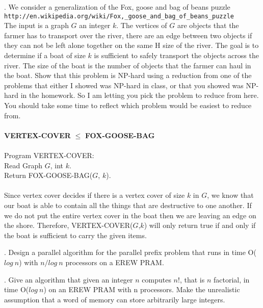 \documentclass[10pt]{article}
\newcommand{\tab}{\hspace*{2em}}
\begin{document}
. We consider a generalization of the Fox, goose and bag of beans puzzle\\
\verb=http://en.wikipedia.org/wiki/Fox,_goose_and_bag_of_beans_puzzle= \\
The input is a graph $G$ an integer $k$. The vertices of $G$ are objects that the farmer has to transport
over the river, there are an edge between two objects if they can not be left alone together on the same
H
size of the river. The goal is to determine if a boat of size $k$ is sufficient to safely transport the objects
across the river. The size of the boat is the number of objects that the farmer can haul in the boat.
Show that this problem is NP-hard using a reduction from one of the problems that either I showed
was NP-hard in class, or that you showed was NP-hard in the homework. So I am letting you pick the
problem to reduce from here. You should take some time to reflect which problem would be easiest to
reduce from.\\
\\
\textbf{VERTEX-COVER} $\leq$ \textbf{FOX-GOOSE-BAG}\\
\\
Program VERTEX-COVER:\\
\tab Read Graph $G$, int $k$.\\
\tab Return FOX-GOOSE-BAG($G$, $k$).\\
\\
Since vertex cover decides if there is a vertex cover of size $k$ in $G$, we know that 
our boat is able to contain all the things that are destructive to one another. If we do
not put the entire vertex cover in the boat then we are leaving an edge on the shore. Therefore,
VERTEX-COVER($G$,$k$) will only return true if and only if the boat is sufficient to carry the given
items. 

. Design a parallel algorithm for the parallel prefix problem that runs in time O($log~n$) with $n/log~n$
processors on a EREW PRAM.

. Give an algorithm that given an integer $n$ computes $n!$, that is $n$ factorial, in time O($log~n$) on an
EREW PRAM with n processors. Make the unrealistic assumption that a word of memory can store
arbitrarily large integers.
\end{document}
